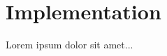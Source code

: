 \chapter{Implementation}

\begin{chapterabstract}
Lorem ipsum dolor sit amet...
\end{chapterabstract}